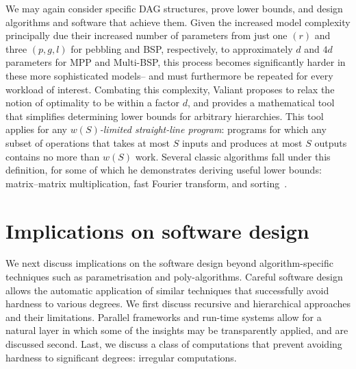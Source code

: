 \documentclass[oneside,reqno, a4paper]{amsart}
\numberwithin{equation}{section}
\let\Oldsection\section
\renewcommand{\section}{\FloatBarrier\Oldsection}
\begin{document}
We may again consider specific DAG structures,
prove lower bounds,
and design algorithms and software that achieve them.
Given the increased model complexity principally due their increased number of parameters from just one $(r)$ and three $(p, g, l)$ for pebbling and BSP, respectively, to approximately $d$ and $4d$ parameters for MPP and Multi-BSP,
this process becomes significantly harder in these more sophisticated models--
and
must furthermore be repeated for every workload of interest.
Combating this complexity,
Valiant proposes to relax the notion of optimality to be within a factor $d$, and
provides a mathematical tool that simplifies determining lower bounds for arbitrary hierarchies.
This tool applies for any \emph{$w(S)$-limited straight-line program}:
programs for which any subset of operations that takes at most $S$ inputs and produces at most $S$ outputs contains no more than $w(S)$ work.
Several classic algorithms fall under this definition,
for some of which he demonstrates deriving useful lower bounds:
matrix--matrix multiplication, fast Fourier transform, and sorting~\cite{valiant11}.



\section{Implications on software design}
\label{sec:software-implications}

We next discuss implications on the software design beyond algorithm-specific techniques such as parametrisation and poly-algorithms. %
Careful software design allows the automatic application of similar techniques that successfully avoid hardness to various degrees.
We first discuss recursive and hierarchical approaches and their limitations.
Parallel frameworks and run-time systems allow for a natural layer in which some of the insights may be transparently applied,
and are discussed second.
Last,
we discuss a class of computations that prevent avoiding hardness to significant degrees: irregular computations.
\end{document}
